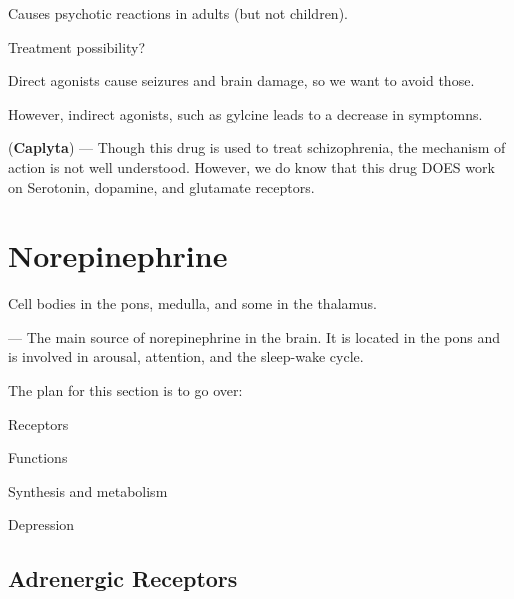 \begin{coloredlist}
\begin{coloredlist}
        \begin{coloredlist}
            \item Causes psychotic reactions in adults (but not children).
        \end{coloredlist}
        \item Treatment possibility?
        \begin{coloredlist}
            \item Direct agonists cause seizures and brain damage, so we want to avoid those. 
            \item However, indirect agonists, such as gylcine leads to a decrease in symptomns.
            \item {} (\textbf{Caplyta}) — Though this drug is used to treat schizophrenia, the mechanism of action is not well understood. However, we do know that this drug DOES work on Serotonin, dopamine, and glutamate receptors.
        \end{coloredlist}
    \end{coloredlist}
\end{coloredlist}

\section{Norepinephrine}

\begin{coloredlist}
    \item Cell bodies in the pons, medulla, and some in the thalamus.
    \item {} — The main source of norepinephrine in the brain. It is located in the pons and is involved in arousal, attention, and the sleep-wake cycle.
    \item The plan for this section is to go over:
    \begin{coloredlist}
        \item Receptors
        \item Functions
        \item Synthesis and metabolism
        \item Depression
    \end{coloredlist}
\end{coloredlist}

\subsection{Adrenergic Receptors}

